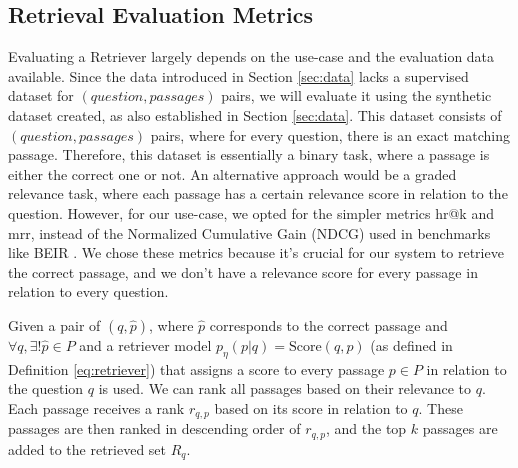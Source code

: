 
\subsection{Retrieval Evaluation Metrics}
\label{subsec:retrieval-eval}

Evaluating a Retriever largely depends on the use-case and the evaluation data available. Since the data introduced in Section \ref{sec:data} lacks a supervised dataset for $(question,\allowbreak passages)$ pairs, we will evaluate it using the synthetic dataset created, as also established in Section \ref{sec:data}. This dataset consists of $(question, passages)$ pairs, where for every question, there is an exact matching passage. Therefore, this dataset is essentially a binary task, where a passage is either the correct one or not. An alternative approach would be a graded relevance task, where each passage has a certain relevance score in relation to the question. However, for our use-case, we opted for the simpler metrics \gls{hr}@k and \gls{mrr}, instead of the Normalized Cumulative Gain (NDCG) used in benchmarks like BEIR \cite{thakur_beir_2021}. We chose these metrics because it's crucial for our system to retrieve the correct passage, and we don't have a relevance score for every passage in relation to every question.

Given a pair of $(q,\hat{p})$, where $\hat{p}$ corresponds to the correct passage and $\forall q, \exists ! \hat{p} \in P$ and a retriever model $p_\eta(p|q) = \text{Score}(q,p)$ (as defined in Definition \ref{eq:retriever}) that assigns a score to every passage $p \in P$ in relation to the question $q$ is used. We can rank all passages based on their relevance to $q$. Each passage receives a rank $r_{q,p}$ based on its score in relation to $q$. These passages are then ranked in descending order of $r_{q,p}$, and the top $k$ passages are added to the retrieved set $R_q$.

